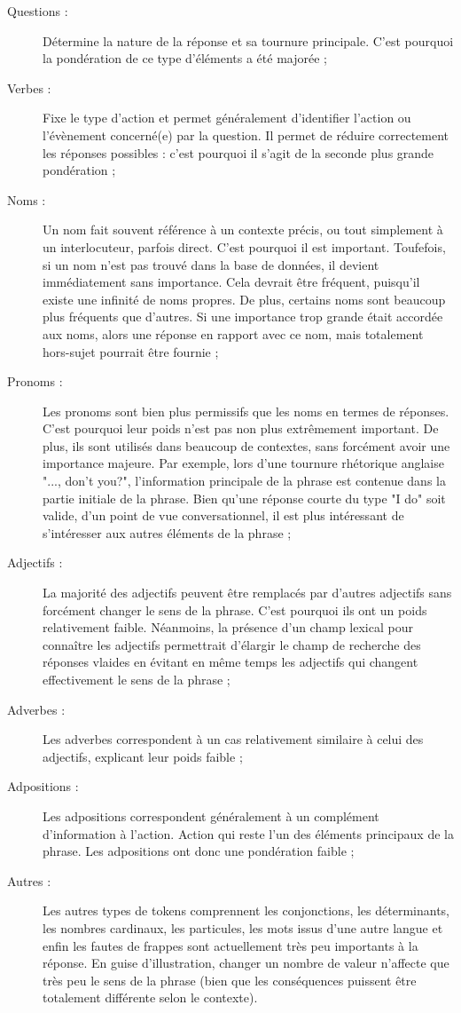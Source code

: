 \begin{description}
  \item[Questions :] Détermine la nature de la réponse et sa tournure principale. C'est pourquoi la pondération de ce type d'éléments a été majorée ;
  \item[Verbes :] Fixe le type d'action et permet généralement d'identifier l'action ou l'évènement concerné(e) par la question. Il permet de réduire correctement les réponses possibles : c'est pourquoi il s'agit de la seconde plus grande pondération ;
  \item[Noms :] Un nom fait souvent référence à un contexte précis, ou tout simplement à un interlocuteur, parfois direct. C'est pourquoi il est important. Toufefois, si un nom n'est pas trouvé dans la base de données, il devient immédiatement sans importance. Cela devrait être fréquent, puisqu'il existe une infinité de noms propres. De plus, certains noms sont beaucoup plus fréquents que d'autres. Si une importance trop grande était accordée aux noms, alors une réponse en rapport avec ce nom, mais totalement hors-sujet pourrait être fournie ;
  \item[Pronoms :] Les pronoms sont bien plus permissifs que les noms en termes de réponses. C'est pourquoi leur poids n'est pas non plus extrêmement important. De plus, ils sont utilisés dans beaucoup de contextes, sans forcément avoir une importance majeure. Par exemple, lors d'une tournure rhétorique anglaise "..., don't you?", l'information principale de la phrase est contenue dans la partie initiale de la phrase. Bien qu'une réponse courte du type "I do" soit valide, d'un point de vue conversationnel, il est plus intéressant de s'intéresser aux autres éléments de la phrase ; 
  \item[Adjectifs :] La majorité des adjectifs peuvent être remplacés par d'autres adjectifs sans forcément changer le sens de la phrase. C'est pourquoi ils ont un poids relativement faible. Néanmoins, la présence d'un champ lexical pour connaître les adjectifs permettrait d'élargir le champ de recherche des réponses vlaides en évitant en même temps les adjectifs qui changent effectivement le sens de la phrase ;
  \item[Adverbes :] Les adverbes correspondent à un cas relativement similaire à celui des adjectifs, explicant leur poids faible ;
  \item[Adpositions :] Les adpositions correspondent généralement à un complément d'information à l'action. Action qui reste l'un des éléments principaux de la phrase. Les adpositions ont donc une pondération faible ;
  \item[Autres :] Les autres types de tokens comprennent les conjonctions, les déterminants, les nombres cardinaux, les particules, les mots issus d'une autre langue et enfin les fautes de frappes sont actuellement très peu importants à la réponse. En guise d'illustration, changer un nombre de valeur n'affecte que très peu le sens de la phrase (bien que les conséquences puissent être totalement différente selon le contexte). 


\end{description}
